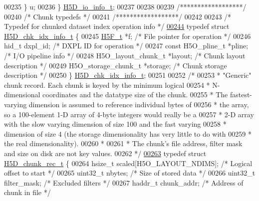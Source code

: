 \begin{DoxyCode}
00235     \} u;
00236 \} \hyperlink{struct_h5_d__io__info__t}{H5D\_io\_info\_t};
00237 
00238 
00239 \textcolor{comment}{/******************/}
00240 \textcolor{comment}{/* Chunk typedefs */}
00241 \textcolor{comment}{/******************/}
00242 
00243 \textcolor{comment}{/* Typedef for chunked dataset index operation info */}
\hyperlink{struct_h5_d__chk__idx__info__t}{00244} \textcolor{keyword}{typedef} \textcolor{keyword}{struct }\hyperlink{struct_h5_d__chk__idx__info__t}{H5D\_chk\_idx\_info\_t} \{
00245     \hyperlink{struct_h5_f__t}{H5F\_t} *f;                   \textcolor{comment}{/* File pointer for operation */}
00246     hid\_t dxpl\_id;              \textcolor{comment}{/* DXPL ID for operation */}
00247     \textcolor{keyword}{const} H5O\_pline\_t *pline;   \textcolor{comment}{/* I/O pipeline info */}
00248     H5O\_layout\_chunk\_t *layout;           \textcolor{comment}{/* Chunk layout description */}
00249     H5O\_storage\_chunk\_t *storage;         \textcolor{comment}{/* Chunk storage description */}
00250 \} \hyperlink{struct_h5_d__chk__idx__info__t}{H5D\_chk\_idx\_info\_t};
00251 
00252 \textcolor{comment}{/*}
00253 \textcolor{comment}{ * "Generic" chunk record.  Each chunk is keyed by the minimum logical}
00254 \textcolor{comment}{ * N-dimensional coordinates and the datatype size of the chunk.}
00255 \textcolor{comment}{ * The fastest-varying dimension is assumed to reference individual bytes of}
00256 \textcolor{comment}{ * the array, so a 100-element 1-D array of 4-byte integers would really be a}
00257 \textcolor{comment}{ * 2-D array with the slow varying dimension of size 100 and the fast varying}
00258 \textcolor{comment}{ * dimension of size 4 (the storage dimensionality has very little to do with}
00259 \textcolor{comment}{ * the real dimensionality).}
00260 \textcolor{comment}{ *}
00261 \textcolor{comment}{ * The chunk's file address, filter mask and size on disk are not key values.}
00262 \textcolor{comment}{ */}
\hyperlink{struct_h5_d__chunk__rec__t}{00263} \textcolor{keyword}{typedef} \textcolor{keyword}{struct }\hyperlink{struct_h5_d__chunk__rec__t}{H5D\_chunk\_rec\_t} \{
00264     hsize\_t scaled[H5O\_LAYOUT\_NDIMS];   \textcolor{comment}{/* Logical offset to start */}
00265     uint32\_t    nbytes;             \textcolor{comment}{/* Size of stored data  */}
00266     uint32\_t    filter\_mask;            \textcolor{comment}{/* Excluded filters */}
00267     haddr\_t     chunk\_addr;                     \textcolor{comment}{/* Address of chunk in file */}

\end{DoxyCode}
